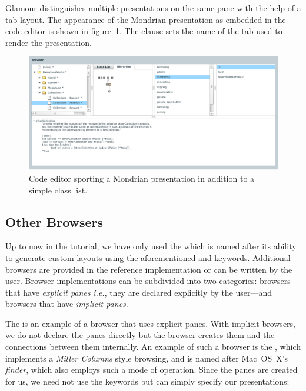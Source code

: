 \documentclass[a4paper,10pt,twoside]{book}
\begin{document}
Glamour distinguishes multiple presentations on the same pane with the
help of a tab layout. The appearance of the Mondrian presentation as
embedded in the code editor is shown in
figure~\ref{fig:mondrian-presentation}. The clause  sets
the name of the tab used to render the presentation.

\begin{figure}[htbp]
\centerline{\includegraphics[width=\linewidth]{mondrian-presentation.pdf}}
\caption{Code editor sporting a Mondrian presentation in addition to a simple class list.}
\label{fig:mondrian-presentation}
\end{figure}


\subsection{Other Browsers}

Up to now in the tutorial, we have only used the
 which is named after its ability to generate
custom layouts using the aforementioned  and 
keywords. Additional browsers are provided in the reference
implementation or can be written by the user. Browser implementations
can be subdivided into two categories: browsers that have
\emph{explicit panes} \emph{i.e.}, they are declared explicitly by the
user---and browsers that have \emph{implicit panes}.

The  is an example of a browser that uses
explicit panes. With implicit browsers, we do not declare the panes
directly but the browser creates them and the connections between them
internally. An example of such a browser is the , which
implements a \emph{Miller Columns} style browsing, and is named after
Mac~OS~X's \emph{finder}, which also employs such a mode of
operation. Since the panes are created for us, we need not use the
 keywords but can simply specify our presentations:
\end{document}

